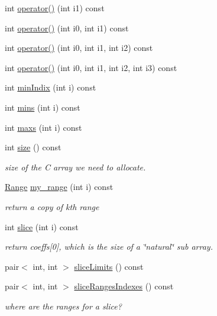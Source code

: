 \begin{DoxyCompactItemize}
\item 
int \hyperlink{classArrays_1_1FEngine_a72b83f7c48ad7a8fd2fc5ac2de3f28bb}{operator()} (int i1) const 
\item 
int \hyperlink{classArrays_1_1FEngine_a705e28236e7eb14bcd3091dc76b4a534}{operator()} (int i0, int i1) const 
\item 
int \hyperlink{classArrays_1_1FEngine_a4a627878d3983c23593b557cfe4fa140}{operator()} (int i0, int i1, int i2) const 
\item 
int \hyperlink{classArrays_1_1FEngine_a209153b11daf1dc33b708d236c86c317}{operator()} (int i0, int i1, int i2, int i3) const 
\item 
int \hyperlink{classArrays_1_1FEngine_a09a12c71ad9703bf8dce82a24428476e}{min\+Indix} (int i) const 
\item 
int \hyperlink{classArrays_1_1FEngine_a3bf36efeca79e02e0187786cade6faad}{mins} (int i) const 
\item 
int \hyperlink{classArrays_1_1FEngine_a4add3785be98a25d1166c9758fb179a1}{maxs} (int i) const 
\item 
int \hyperlink{classArrays_1_1FEngine_abdd71e76e671a3731aae793e6c482287}{size} () const 
\begin{DoxyCompactList}\small\item\em size of the C array we need to allocate. \end{DoxyCompactList}\item 
\hyperlink{structArrays_1_1Range}{Range} \hyperlink{classArrays_1_1FEngine_a2716ef7750e2946399bf463c4406d080}{my\+\_\+range} (int i) const 
\begin{DoxyCompactList}\small\item\em return a copy of kth range \end{DoxyCompactList}\item 
int \hyperlink{classArrays_1_1FEngine_a4279cd21a94ae8b04bf7e8ee58535679}{slice} (int i) const 
\begin{DoxyCompactList}\small\item\em return coeffs\mbox{[}0\mbox{]}, which is the size of a \char`\"{}natural\char`\"{} sub array. \end{DoxyCompactList}\item 
pair$<$ int, int $>$ \hyperlink{classArrays_1_1FEngine_a22f0ef3f1e408e6d6ba864468bb4907f}{slice\+Limits} () const 
\item 
pair$<$ int, int $>$ \hyperlink{classArrays_1_1FEngine_a96ef7f338ed9cc5486408b8b162b42db}{slice\+Ranges\+Indexes} () const 
\begin{DoxyCompactList}\small\item\em where are the ranges for a slice? \end{DoxyCompactList}\end{DoxyCompactItemize}
